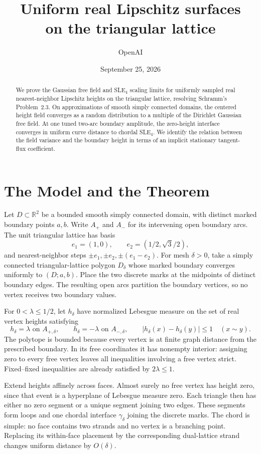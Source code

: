 \documentclass[11pt]{article}
\title{Uniform real Lipschitz surfaces\\on the triangular lattice}
\author{OpenAI}
\date{September 25, 2026}
\theoremstyle{definition}
\theoremstyle{remark}
\newcommand{\R}{\mathbb R}
\numberwithin{equation}{section}
\begin{document}
\maketitle
\begin{abstract}
We prove the Gaussian free field and SLE$_4$ scaling limits for uniformly
sampled real nearest-neighbor Lipschitz heights on the triangular lattice,
resolving Schramm's Problem~2.3. On approximations of smooth simply connected
domains, the centered height field converges as a random distribution to a
multiple of the Dirichlet Gaussian free field. At one tuned two-arc boundary
amplitude, the zero-height interface converges in uniform curve distance to
chordal SLE$_4$. We identify the relation between the field variance and the
boundary height in terms of an implicit stationary tangent-flux coefficient.
\end{abstract}
\tableofcontents

\section{The Model and the Theorem}\label{sec:model}
Let $D\subset\R^2$ be a bounded smooth simply connected domain, with
distinct marked boundary points $a,b$. Write $A_+$ and $A_-$ for its
intervening open boundary arcs. The unit triangular lattice has basis
\[
 e_1=(1,0),\qquad e_2=(1/2,\sqrt3/2),
\]
and nearest-neighbor steps $\pm e_1,\pm e_2,\pm(e_1-e_2)$. For mesh
$\delta>0$, take a simply connected triangular-lattice polygon $D_\delta$
whose marked boundary converges uniformly to $(D;a,b)$. Place the two
discrete marks at the midpoints of distinct boundary edges. The resulting
open arcs partition the boundary vertices, so no vertex receives two
boundary values.

For $0<\lambda\le1/2$, let $h_\delta$ have normalized Lebesgue measure on
the set of real vertex heights satisfying
\begin{equation}\label{eq:model}
 h_\delta=\lambda\text{ on }A_{+,\delta},\qquad
 h_\delta=-\lambda\text{ on }A_{-,\delta},\qquad
 |h_\delta(x)-h_\delta(y)|\le1\quad(x\sim y).
\end{equation}
The polytope is bounded because every vertex is at finite graph distance
from the prescribed boundary. In its free coordinates it has nonempty
interior: assigning zero to every free vertex leaves all inequalities
involving a free vertex strict. Fixed--fixed inequalities are already
satisfied by $2\lambda\le1$.

Extend heights affinely across faces. Almost surely no free vertex has
height zero, since that event is a hyperplane of Lebesgue measure zero.
Each triangle then has either no zero segment or a unique segment joining
two edges. These segments form loops and one chordal interface
$\gamma_\delta$ joining the discrete marks. The chord is simple: no face
contains two strands and no vertex is a branching point. Replacing its
within-face placement by the corresponding dual-lattice strand changes
uniform distance by $O(\delta)$.
\end{document}
